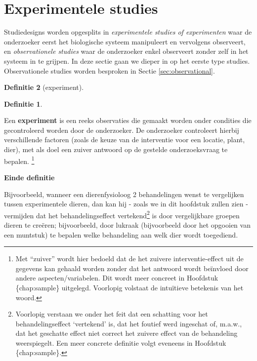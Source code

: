 \documentclass[
  12pt,dutch,coursenotes]{book}
\theoremstyle{definition}
\newtheorem{definition}{Definitie}[chapter]
\theoremstyle{definition}
\theoremstyle{definition}
\theoremstyle{remark}
\begin{document}
\hypertarget{experimentele-studies}{%
\section{Experimentele studies}\label{experimentele-studies}}

Studiedesigns worden opgesplits in \emph{experimentele studies of experimenten} waar de onderzoeker eerst het biologische systeem manipuleert en vervolgens observeert, en \emph{observationele studies} waar de onderzoeker enkel observeert zonder zelf in het systeem in te grijpen. In deze sectie gaan we dieper in op het eerste type studies. Observationele studies worden besproken in Sectie \ref{sec:observational}.

\begin{definition}[experiment]
\begin{definition}

\protect\hypertarget{def:unnamed-chunk-64}{}{\label{def:unnamed-chunk-64} \iffalse (experiment) \fi{} }

\end{definition}
\end{definition}

Een \textbf{experiment} is een reeks observaties die gemaakt worden onder
condities die gecontroleerd worden door de onderzoeker. De onderzoeker
controleert hierbij verschillende factoren (zoals de keuze van de
interventie voor een locatie, plant, dier), met als doel een zuiver antwoord op de gestelde onderzoeksvraag te bepalen.
\footnote{Met ``zuiver'' wordt hier bedoeld dat de het zuivere interventie-effect uit de gegevens
  kan gehaald worden zonder dat het antwoord wordt beïnvloed door andere aspecten/variabelen. Dit wordt meer concreet in Hoofdstuk \{chap:sample\}
  uitgelegd. Voorlopig volstaat de intuïtieve betekenis van het woord.}

\textbf{Einde definitie}

Bijvoorbeeld, wanneer een dierenfysioloog 2 behandelingen wenst te vergelijken tussen experimentele dieren,
dan kan hij - zoals we in dit hoofdstuk zullen zien - vermijden dat het
behandelingseffect vertekend\footnote{ Voorlopig verstaan we onder het feit dat een schatting voor het
  behandelingseffect `vertekend' is, dat het foutief werd ingeschat of, m.a.w., dat het geschatte effect niet correct het zuivere effect van de behandeling weerspiegelt. Een meer concrete definitie volgt eveneens in
  Hoofdstuk \{chap:sample\}.} is door vergelijkbare groepen dieren te creëren;
bijvoorbeeld, door lukraak (bijvoorbeeld door
het opgooien van een muntstuk) te bepalen welke behandeling aan welk
dier wordt toegediend.
\end{document}
